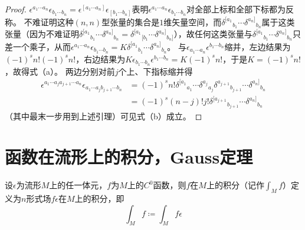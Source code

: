 \begin{proof}
    $\epsilon^{a_1 \cdots a_n}\epsilon_{b_1 \cdots b_n} = \epsilon^{[a_1 \cdots a_n]}\epsilon_{[b_1 \cdots b_n]}$表明$\epsilon^{a_1 \cdots a_n}\epsilon_{b_1 \cdots b_n}$对全部上标和全部下标都为反称。
    不难证明这种$(n, n)$型张量的集合是$1$维矢量空间，而$\delta^{[a_1}{}_{b_1} \cdots \delta^{a_n]}{}_{b_n}$属于这类张量（因为不难证明$\delta^{[a_1}{}_{b_1} \cdots \delta^{a_n]}{}_{b_n} = \delta^{[a_1}{}_{[b_1} \cdots \delta^{a_n]}{}_{b_n]}$），故任何这类张量与$\delta^{[a_1}{}_{b_1} \cdots \delta^{a_n]}{}_{b_n}$只差一个乘子，从而$\epsilon^{a_1 \cdots a_n}\epsilon_{b_1 \cdots b_n} = K\delta^{[a_1}{}_{b_1} \cdots \delta^{a_n]}{}_{b_n}$。
    与$\epsilon_{a_1 \cdots a_n}\epsilon^{b_1 \cdots b_n}$缩并，左边结果为$(-1)^sn!(-1)^sn!$，右边结果为$K\epsilon_{b_1 \cdots b_n}\epsilon^{b_1 \cdots b_n} = K(-1)^sn!$，于是$K = (-1)^sn!$，故得式（a）。
    两边分别对前$j$个上、下指标缩并得
    \[\begin{split}
        \epsilon^{a_1 \cdots a_j a_{j + 1} \cdots a_n}\epsilon_{a_1 \cdots a_j b_{j + 1} \cdots b_n} & = (-1)^sn!\delta^{[a_1}{}_{a_1} \cdots \delta^{a_j}{}_{a_j}\delta^{a_{j + 1}}{}_{b_{j + 1}} \cdots \delta^{a_n]}{}_{b_n} \\
        & = (-1)^s(n - j)!j!\delta^{[a_{j + 1}}{}_{b_{j + 1}} \cdots \delta^{a_n]}{}_{b_n}
    \end{split}\]
    （其中最末一步用到上述引理）可见式（b）成立。
\end{proof}

\section{函数在流形上的积分，Gauss定理}

\begin{definition}
    设$\epsilon$为流形$M$上的任一体元，$f$为$M$上的$C^0$函数，则$f$在$M$上的积分（记作$\displaystyle\int_Mf$）定义为$n$形式场$f\epsilon$在$M$上的积分，即
    $$\int_Mf \coloneq \int_Mf\epsilon$$
\end{definition}

